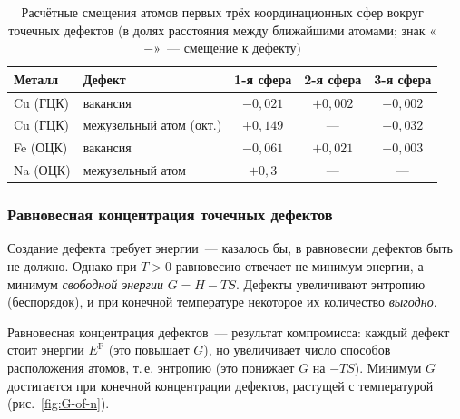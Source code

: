 \begin{table}[ht]
\centering
\caption{Расчётные смещения атомов первых трёх координационных сфер
вокруг точечных дефектов (в долях расстояния между ближайшими атомами;
знак «$-$»~— смещение к дефекту)}
\label{tab:relax}
\small
\begin{tabular}{@{}llccc@{}}
\toprule
Металл & Дефект & 1-я сфера & 2-я сфера & 3-я сфера \\
\midrule
Cu (ГЦК) & вакансия & $-0{,}021$ & $+0{,}002$ & $-0{,}002$ \\
Cu (ГЦК) & межузельный атом (окт.) & $+0{,}149$ & --- & $+0{,}032$ \\
Fe (ОЦК) & вакансия & $-0{,}061$ & $+0{,}021$ & $-0{,}003$ \\
Na (ОЦК) & межузельный атом & $+0{,}3$ & --- & --- \\
\bottomrule
\end{tabular}
\end{table}

\subsubsection{Равновесная концентрация точечных дефектов}\label{sssec:eq-conc}

Создание дефекта требует энергии~— казалось бы, в равновесии дефектов
быть не должно. Однако при $T>0$ равновесию отвечает не минимум энергии,
а минимум \emph{свободной энергии} $G=H-TS$. Дефекты увеличивают энтропию
(беспорядок), и при конечной температуре некоторое их количество
\emph{выгодно}.

\begin{glavnoe}
Равновесная концентрация дефектов~— результат компромисса: каждый дефект
стоит энергии $E^{\mathrm F}$ (это повышает $G$), но увеличивает число
способов расположения атомов, т.\,е. энтропию (это понижает $G$ на
$-TS$). Минимум $G$ достигается при конечной концентрации дефектов,
растущей с температурой (рис.~\ref{fig:G-of-n}).
\end{glavnoe}


